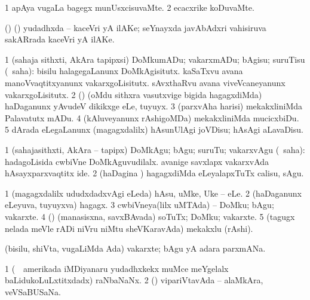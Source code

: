 \bentry
{} 
\gl{\kirxvi}
\expl{}
\bmng
\bnum
\num{1} apAya \mo vugaLa bagegx munUsxcisuvaMte. 
\num{2} ecacxrike koDuvaMte. 
\enum
\emng
\eentry

\bentry
{} 
\gl{\nA}
\expl{}
\bmng
(\birx) (\ca) yudadhxda -- kaceVri yA ilAKe; seYnayxda javAbAdxri vahisiruva sakARrada kaceVri yA ilAKe. 
\emng
\eentry

\bentry
{} 
\gl{\sakirx}
\expl{}
\bmng
\bnum
\num{1} (sahaja sithxti, AkAra tapipxsi) DoMkumADu; vakarxmADu; bAgisu; suruTisu (\rUpa\ saha):  bisilu halagegaLanunx DoMkAgisitutx.  kaSaTxvu avana manoVvaqtitxyanunx vakarxgoLisitutx.  sAvxthaRvu avana viveVcaneyanunx vakarxgoLisitutx. 
\num{2} (\nw) (oMdu sithxra vasutxvige bigida hagagxdiMda) haDaganunx yAvudeV dikikxge eLe, tuyuyx. 
\num{3} (parxvAha harisi) mekakxliniMda Palavatutx mADu. 
\num{4} (kAluveyanunx rAshigoMDa) mekakxliniMda mucicxbiDu. 
\num{5} dArada eLegaLanunx (magagxdalilx) hAsunUlAgi joVDisu; hAsAgi aLavaDisu. 
\enum
\emng

\noindent 
\gl{\akirx}
\expl{}
\bmng
\bnum
\num{1} (sahajasithxti, AkAra -- tapipx) DoMkAgu; bAgu; suruTu; vakarxvAgu (\rUpa\ saha):  hadagoLisida cwbiVne DoMkAguvudilalx.  avanige savxlapx vakarxvAda hAsayxparxvaqtitx ide. 
\num{2} (haDagina \vi) hagagxdiMda eLeyalapxTuTx calisu, sAgu. 
\enum
\emng
\eentry

\bentry
{} 
\gl{\nA}
\expl{}
\bmng
\bnum
\num{1} (magagxdalilx ududxdadxvAgi eLeda) hAsu, uMke, Uke -- eLe. 
\num{2} (haDaganunx eLeyuva, tuyuyxva) hagagx. 
\num{3} cwbiVneya(lilx uMTAda) -- DoMku; bAgu; vakarxte. 
\num{4} (\rUpa) (manasisxna, savxBAvada) soTuTx; DoMku; vakarxte. 
\num{5} (tagugx nelada meVle rADi niVru niMtu sheVKaravAda) mekakxlu (rAshi). 
\enum
\emng
\eentry

\bentry
{} 
\gl{\nA}
\expl{}
\bmng
(bisilu, shiVta, \mo vugaLiMda Ada) vakarxte; bAgu yA adara parxmANa. 
\emng
\eentry

\bentry
{} 
\gl{\nA}
\expl{}
\bmng
\bnum
\num{1} (\kanmu\ \kanu\ amerikada iMDiyanaru yudadhxkekx muMce meYgelalx baLidukoLuLxtitxdadx) raNbaNaNx. 
\num{2} (\AmA) vipariVtavAda -- alaMkAra, veVSaBUSaNa. 
\enum
\emng
\eentry

